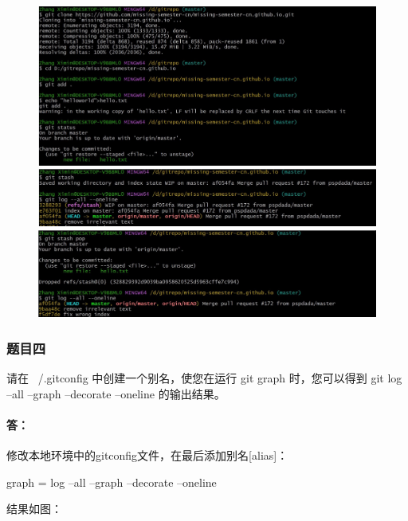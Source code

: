 \documentclass[a4paper, 12pt]{article}
\begin{document}
	\begin{figure}[H]
		\centering
		\includegraphics[width=1\textwidth]{009.jpg}
		\includegraphics[width=1\textwidth]{010.jpg}
		\includegraphics[width=1\textwidth]{011.jpg}
	\end{figure}
	
	\subsubsection{题目四}
	请在 ~/.gitconfig 中创建一个别名，使您在运行 git graph 时，您可以得到 git log --all --graph --decorate --oneline 的输出结果。
	
	\paragraph{答：}
	修改本地环境中的gitconfig文件，在最后添加别名[alias]：

		graph = log --all --graph --decorate --oneline
		
	结果如图：
	
\end{document}

